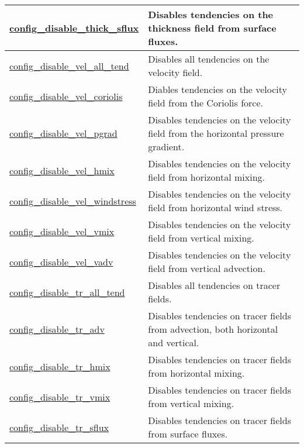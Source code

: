 {\begin{center}
\begin{longtable}{| p{2.0in} || p{4.0in} |}
	\hline
	\hyperref[subsec:nm_sec_config_disable_thick_sflux]{config\_disable\_thick\_sflux} & Disables tendencies on the thickness field from surface fluxes. \\
	\hline
	\hyperref[subsec:nm_sec_config_disable_vel_all_tend]{config\_disable\_vel\_all\_tend} & Disables all tendencies on the velocity field. \\
	\hline
	\hyperref[subsec:nm_sec_config_disable_vel_coriolis]{config\_disable\_vel\_coriolis} & Diables tendencies on the velocity field from the Coriolis force. \\
	\hline
	\hyperref[subsec:nm_sec_config_disable_vel_pgrad]{config\_disable\_vel\_pgrad} & Disables tendencies on the velocity field from the horizontal pressure gradient. \\
	\hline
	\hyperref[subsec:nm_sec_config_disable_vel_hmix]{config\_disable\_vel\_hmix} & Disables tendencies on the velocity field from horizontal mixing. \\
	\hline
	\hyperref[subsec:nm_sec_config_disable_vel_windstress]{config\_disable\_vel\_windstress} & Disables tendencies on the velocity field from horizontal wind stress. \\
	\hline
	\hyperref[subsec:nm_sec_config_disable_vel_vmix]{config\_disable\_vel\_vmix} & Disables tendencies on the velocity field from vertical mixing. \\
	\hline
	\hyperref[subsec:nm_sec_config_disable_vel_vadv]{config\_disable\_vel\_vadv} & Disables tendencies on the velocity field from vertical advection. \\
	\hline
	\hyperref[subsec:nm_sec_config_disable_tr_all_tend]{config\_disable\_tr\_all\_tend} & Disables all tendencies on tracer fields. \\
	\hline
	\hyperref[subsec:nm_sec_config_disable_tr_adv]{config\_disable\_tr\_adv} & Disables tendencies on tracer fields from advection, both horizontal and vertical. \\
	\hline
	\hyperref[subsec:nm_sec_config_disable_tr_hmix]{config\_disable\_tr\_hmix} & Disables tendencies on tracer fields from horizontal mixing. \\
	\hline
	\hyperref[subsec:nm_sec_config_disable_tr_vmix]{config\_disable\_tr\_vmix} & Disables tendencies on tracer fields from vertical mixing. \\
	\hline
	\hyperref[subsec:nm_sec_config_disable_tr_sflux]{config\_disable\_tr\_sflux} & Disables tendencies on tracer fields from surface fluxes. \\
	\hline
\end{longtable}
\end{center}
}
